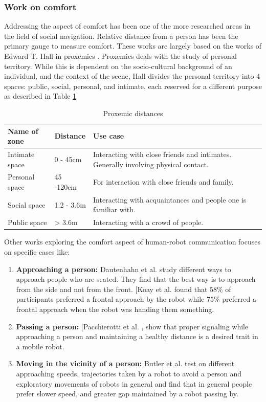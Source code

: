 \subsubsection{Work on comfort}
Addressing the aspect of comfort has been one of the more researched areas in the field of social navigation. Relative distance from a person has been the primary gauge to measure comfort. These works are largely based on the works of Edward T. Hall in proxemics \cite{proxemics_hall_1968}. Proxemics deals with the study of personal territory. While this is dependent on the socio-cultural background of an individual, and the context of the scene, Hall divides the personal territory into 4 spaces: public, social, personal, and intimate, each reserved for a different purpose as described in Table \ref{tab:proxemics}
\begin{table}
    \label{tab:proxemics}
    \caption{Proxemic distances}
    \begin{center}
        \renewcommand{\arraystretch}{1.3}
        \begin{tabular}{|p{}|p{}|p{}|}
            \hline
            Name of zone & Distance & Use case \\
            \hline\hline
            Intimate space & 0 - 45cm &  Interacting with close friends and intimates. Generally involving physical contact.\\
            Personal space & 45 -120cm &  For interaction with close friends and family. \\
            Social space & 1.2 - 3.6m &  Interacting with acquaintances and people one is familiar with.\\
            Public space & > 3.6m &  Interacting with a crowd of people.\\
            \hline
        \end{tabular}
    \end{center}
\end{table}
Other works exploring the comfort aspect of human-robot communication focuses on specific cases like:
\begin{enumerate}
    \item \textbf{Approaching a person:} Dautenhahn et al. \cite{dautenhahn_2006}  study different ways to approach people who are seated. They find that the best way is to approach from the side and not from the front.
    [Koay et al. \cite{koay2007ExploratorySO}  found that $58\%$ of participants preferred a frontal approach by the robot while $75\%$ preferred a frontal approach when the robot was handing them something.
    \item \textbf{Passing a person:} [Pacchierotti et al. \cite{pacchierotti_2006} \cite{pacchierotti_2005},  show that proper signaling while approaching a person and maintaining a healthy distance is a desired trait in a mobile robot.
    \item \textbf{Moving in the vicinity of a person:}  Butler et al. \cite{butler_2001} test on different approaching speeds, trajectories taken by a robot to avoid a person and exploratory movements of robots in general and find that in general people prefer slower speed, and greater gap maintained by a robot passing by.
\end{enumerate}

